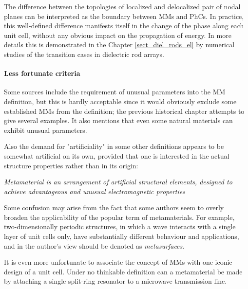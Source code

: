 The difference between the topologies of localized and delocalized pair of nodal planes can be interpreted as the boundary between MMs and PhCs. In practice, this well-defined difference manifests itself in the change of the phase along each unit cell, without any obvious impact on the propagation of energy. In more details this is demonstrated in the Chapter \ref{sect_diel_rods_el}  %
by numerical studies of the transition cases in dielectric rod arrays.

\paragraph{Less fortunate criteria} %
Some sources include the requirement of unusual parameters into the MM definition, but this is hardly acceptable since it would obviously exclude some established MMs from the definition; the previous historical chapter attempts to give several examples. It also mentions that even some natural materials can exhibit unusual parameters.

Also the demand for "artificiality" in some other definitions appears to be somewhat artificial on its own, provided that one is interested in the actual structure properties rather than in its origin:
\begin{displayquote}
	\textit{Metamaterial is an arrangement of artificial structural elements, designed to achieve advantageous and unusual electromagnetic properties} \cite{metamorphose-web} 
\end{displayquote}

Some confusion may arise from the fact that some authors seem to overly broaden the applicability of the popular term of metamaterials. For example, two-dimensionally periodic structures, in which a wave interacts with a single layer of unit cells only, have substantially different behaviour and applications, and in the author's view should be denoted as \textit{metasurfaces}.

It is even more unfortunate to associate the concept of MMs with one iconic design of a unit cell. Under no thinkable definition can a metamaterial be made by attaching a single split-ring resonator to a microwave transmission line. 

